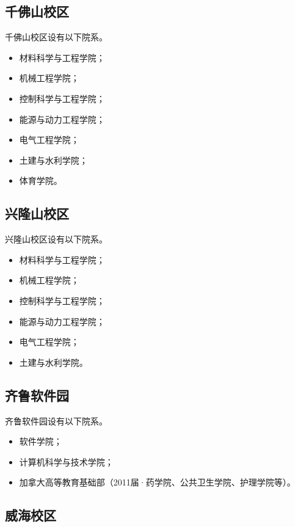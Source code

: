 \documentclass[openany]{sduthesis} %
\begin{document}
\subsection{千佛山校区}

千佛山校区设有以下院系。

\begin{itemize}
  \item 材料科学与工程学院；
  \item 机械工程学院；
  \item 控制科学与工程学院；
  \item 能源与动力工程学院；
  \item 电气工程学院；
  \item 土建与水利学院；
  \item 体育学院。
\end{itemize}

\subsection{兴隆山校区}

兴隆山校区设有以下院系。

\begin{itemize}
  \item 材料科学与工程学院；
  \item 机械工程学院；
  \item 控制科学与工程学院；
  \item 能源与动力工程学院；
  \item 电气工程学院；
  \item 土建与水利学院。
\end{itemize}

\subsection{齐鲁软件园}

齐鲁软件园设有以下院系。

\begin{itemize}
  \item 软件学院；
  \item 计算机科学与技术学院；
  \item 加拿大高等教育基础部（2011届·药学院、公共卫生学院、护理学院等）。
\end{itemize}

\subsection{威海校区}
\end{document}
